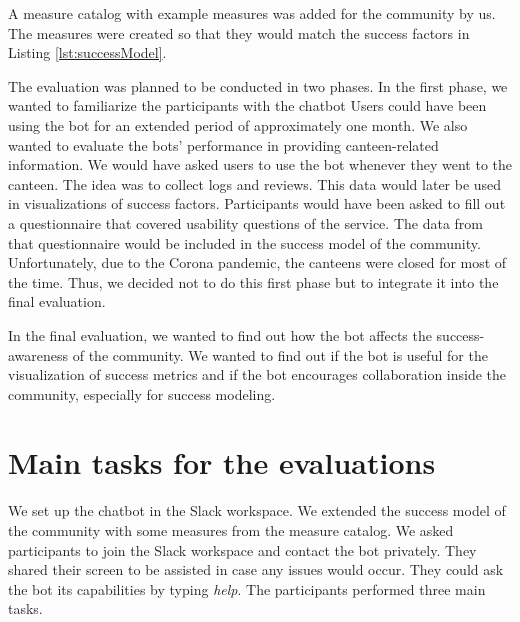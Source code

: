A measure catalog with example measures was added for the community by us. The measures were created so that they would match the success factors in Listing \ref{lst:successModel}.

The evaluation was planned to be conducted in two phases.
In the first phase, we wanted to familiarize the participants with the chatbot
Users could have been using the bot for an extended period of approximately one month. 
We also wanted to evaluate the bots' performance in providing canteen-related information.
We would have asked users to use the bot whenever they went to the canteen. 
The idea was to collect logs and reviews. This data would later be used in visualizations of success factors. 
Participants would have been asked to fill out a questionnaire that covered usability questions of the service. The data from that questionnaire would be included in the success model of the community.
Unfortunately, due to the Corona pandemic, the canteens were closed for most of the time. Thus, we decided not to do this first phase but to integrate it into the final evaluation.

In the final evaluation, we wanted to find out how the bot affects the success-awareness of the community.
We wanted to find out if the bot is useful for the visualization of success metrics and if the bot encourages collaboration inside the community, especially for success modeling.



\section{Main tasks for the evaluations}

We set up the chatbot in the Slack workspace. 
We extended the success model of the community with some measures from the measure catalog. 
We asked participants to join the Slack workspace and contact the bot privately. They shared their screen to be assisted in case any issues would occur. They could ask the bot its capabilities by typing \emph{help}.
The participants performed three main tasks.

